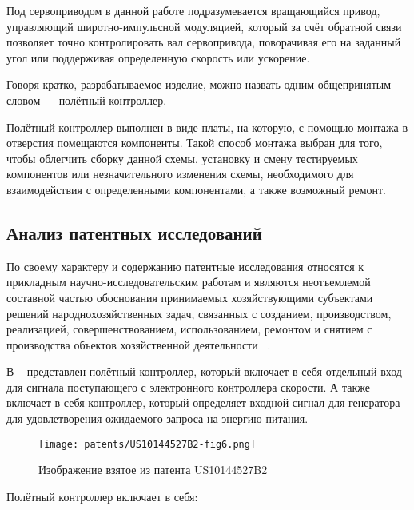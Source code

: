 Под сервоприводом в данной работе подразумевается вращающийся привод,
управляющий широтно-импульсной модуляцией, который за счёт обратной
связи позволяет точно контролировать вал сервопривода, поворачивая его
на заданный угол или поддерживая определенную скорость или ускорение.

Говоря кратко, разрабатываемое изделие, можно назвать одним
общепринятым словом — полётный контроллер.

Полётный контроллер выполнен в виде платы, на которую, с помощью
монтажа в отверстия помещаются компоненты. Такой способ монтажа выбран
для того, чтобы облегчить сборку данной схемы, установку и смену
тестируемых компонентов или незначительного изменения схемы,
необходимого для взаимодействия с определенными компонентами, а также
возможный ремонт.


\subsection{Анализ патентных исследований}

По своему характеру и содержанию патентные исследования относятся к
прикладным научно-исследовательским работам и являются неотъемлемой
составной частью обоснования принимаемых хозяйствующими субъектами
решений народнохозяйственных задач, связанных с созданием,
производством, реализацией, совершенствованием, использованием,
ремонтом и снятием с производства
объектов хозяйственной деятельности ~\cite{GOST-R-15.011-96}.

В ~\cite{US10144527B2} представлен полётный контроллер, который
включает в себя отдельный вход для сигнала поступающего с электронного
контроллера скорости. А также включает в себя контроллер, который
определяет входной сигнал для генератора для удовлетворения ожидаемого
запроса на энергию питания.


\begin{figure}[H]
  \centering
  \texttt{[image: patents/US10144527B2-fig6.png]}
  \caption{Изображение взятое из патента US10144527B2}
\end{figure}

Полётный контроллер включает в себя:

\newpage

